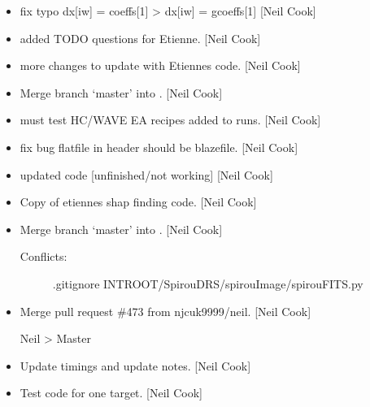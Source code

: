 \documentclass[a4paper,10pt,english]{report}
\begin{document}
\label{\detokenize{misc/changelog:id327}}\begin{itemize}
\item {} 
 \sphinxhyphen{} fix typo dx{[}iw{]} = coeffs{[}1{]} \textendash{}\textgreater{} dx{[}iw{]} =
gcoeffs{[}1{]} {[}Neil Cook{]}

\item {} 
 \sphinxhyphen{} added TODO questions for Etienne. {[}Neil Cook{]}

\item {} 
 \sphinxhyphen{} more changes to update with Etiennes
 code. {[}Neil Cook{]}

\item {} 
Merge branch ‘master’ into . {[}Neil Cook{]}

\item {} 
 \sphinxhyphen{} must test HC/WAVE EA recipes \sphinxhyphen{} added to runs. {[}Neil
Cook{]}

\item {} 
 \sphinxhyphen{} fix bug flatfile in header should be
blazefile. {[}Neil Cook{]}

\item {} 
 \sphinxhyphen{} updated code {[}unfinished/not working{]} {[}Neil
Cook{]}

\item {} 
Copy of etiennes shap finding code. {[}Neil Cook{]}

\item {} 
Merge branch ‘master’ into . {[}Neil Cook{]}
\begin{description}
\item[{Conflicts:}] \leavevmode
.gitignore
INTROOT/SpirouDRS/spirouImage/spirouFITS.py

\end{description}

\item {} 
Merge pull request \#473 from njcuk9999/neil. {[}Neil Cook{]}

Neil \textendash{}\textgreater{} Master

\item {} 
Update timings and update notes. {[}Neil Cook{]}

\item {} 
Test code for one target. {[}Neil Cook{]}


\end{itemize}
\end{document}
